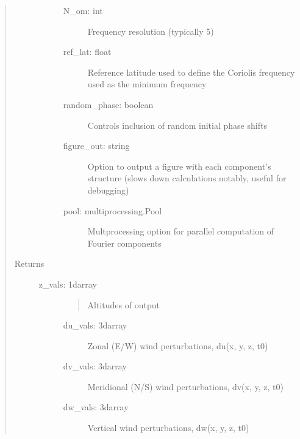 \documentclass[letterpaper,10pt,english]{sphinxmanual}
\begin{document}
\begin{fulllineitems}
\begin{quote}
\begin{description}
\begin{description}
\begin{description}
\item[{N\_om: int}] \leavevmode
Frequency resolution (typically 5)

\item[{ref\_lat: float}] \leavevmode
Reference latitude used to define the Coriolis frequency used as the minimum frequency

\item[{random\_phase: boolean}] \leavevmode
Controls inclusion of random initial phase shifts

\item[{figure\_out: string}] \leavevmode
Option to output a figure with each component’s structure (slows down calculations notably, useful for debugging)

\item[{pool: multiprocessing.Pool}] \leavevmode
Multprocessing option for parallel computation of Fourier components

\end{description}

\end{description}

\item[{Returns}] \leavevmode\begin{description}
\item[{z\_vals: 1darray}] \leavevmode\begin{quote}

Altitudes of output
\end{quote}
\begin{description}
\item[{du\_vals: 3darray}] \leavevmode
Zonal (E/W) wind perturbations, du(x, y, z, t0)

\item[{dv\_vals: 3darray}] \leavevmode
Meridional (N/S) wind perturbations, dv(x, y, z, t0)

\item[{dw\_vals: 3darray}] \leavevmode
Vertical wind perturbations, dw(x, y, z, t0)

\end{description}

\end{description}

\end{description}\end{quote}

\end{fulllineitems}

\end{document}
